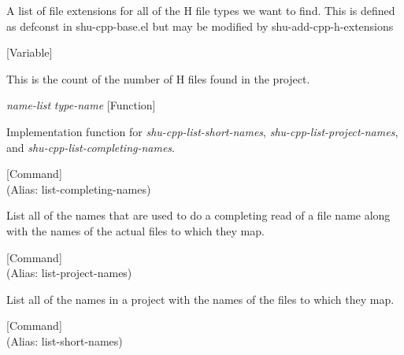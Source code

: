 \begin{doc-string}
A list of file extensions for all of the H file types we want to find.  This is defined
as defconst in shu-cpp-base.el but may be modified by shu-add-cpp-h-extensions
\end{doc-string}

\vspace{1em}
\noindent
{}
\usebox{\funcname}
 \hfill [Variable]

\begin{doc-string}
This is the count of the number of H files found in the project.
\end{doc-string}

\vspace{1em}
\noindent
{}
\usebox{\funcname}\emph{name-list} \emph{type-name}
 \hfill [Function]

\begin{doc-string}
Implementation function for \emph{shu-cpp-list-short-names},
\emph{shu-cpp-list-project-names}, and \emph{shu-cpp-list-completing-names}.
\end{doc-string}

\vspace{1em}
\noindent
{}
\usebox{\funcname}
 \hfill [Command]\\%
 (Alias: list-completing-names)

\begin{doc-string}
List all of the names that are used to do a completing read of a file name
along with the names of the actual files to which they map.
\end{doc-string}

\vspace{1em}
\noindent
{}
\usebox{\funcname}
 \hfill [Command]\\%
 (Alias: list-project-names)

\begin{doc-string}
List all of the names in a project with the names of the files to
which they map.
\end{doc-string}

\vspace{1em}
\noindent
{}
\usebox{\funcname}
 \hfill [Command]\\%
 (Alias: list-short-names)

